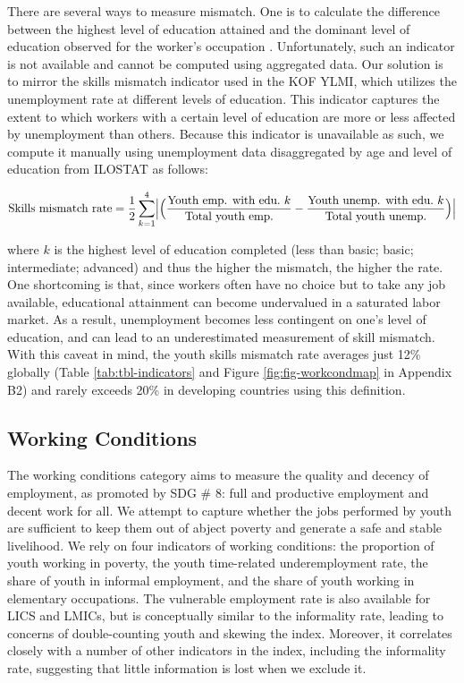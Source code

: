 \documentclass[
  a4paper, twoside, 12pt]{book}
\begin{document}
There are several ways to measure mismatch. One is to calculate the difference between the highest level of education attained and the dominant level of education observed for the worker's occupation \autocite{herrera2013}. Unfortunately, such an indicator is not available and cannot be computed using aggregated data. Our solution is to mirror the skills mismatch indicator used in the KOF YLMI, which utilizes the unemployment rate at different levels of education. This indicator captures the extent to which workers with a certain level of education are more or less affected by unemployment than others. Because this indicator is unavailable as such, we compute it manually using unemployment data disaggregated by age and level of education from ILOSTAT as follows:

\footnotesize

\[\text{Skills mismatch rate}= \frac{1}{2} \sum_{k=1}^4 \Bigl| \Bigl(\frac{\text{Youth emp. with edu.} \ k}{\text{Total youth emp.}}- \frac{\text{Youth unemp. with edu.} \ k}{\text{Total youth unemp.}}\Bigl)\Bigl|\]
\normalsize
\vspace*{5pt}

where \(k\) is the highest level of education completed (less than basic; basic; intermediate; advanced) and thus the higher the mismatch, the higher the rate. One shortcoming is that, since workers often have no choice but to take any job available, educational attainment can become undervalued in a saturated labor market. As a result, unemployment becomes less contingent on one's level of education, and can lead to an underestimated measurement of skill mismatch. With this caveat in mind, the youth skills mismatch rate averages just 12\% globally (Table \ref{tab:tbl-indicators} and Figure \ref{fig:fig-workcondmap} in Appendix B2) and rarely exceeds 20\% in developing countries using this definition.

\hypertarget{working-conditions}{%
\subsection{Working Conditions}\label{working-conditions}}

The working conditions category aims to measure the quality and decency of employment, as promoted by SDG \# 8: full and productive employment and decent work for all. We attempt to capture whether the jobs performed by youth are sufficient to keep them out of abject poverty and generate a safe and stable livelihood. We rely on four indicators of working conditions: the proportion of youth working in poverty, the youth time-related underemployment rate, the share of youth in informal employment, and the share of youth working in elementary occupations. The vulnerable employment rate is also available for LICS and LMICs, but is conceptually similar to the informality rate, leading to concerns of double-counting youth and skewing the index. Moreover, it correlates closely with a number of other indicators in the index, including the informality rate, suggesting that little information is lost when we exclude it.
\end{document}
